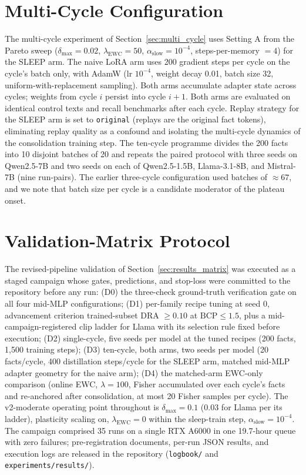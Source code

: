 \section{Multi-Cycle Configuration}
\label{app:multi_cycle}

The multi-cycle experiment of Section~\ref{sec:multi_cycle} uses Setting A from the Pareto sweep ($\delta_{\max} = 0.02$, $\lambda_{\mathrm{EWC}} = 50$, $\alpha_{\mathrm{slow}} = 10^{-4}$, steps-per-memory $= 4$) for the SLEEP arm. The naive LoRA arm uses 200 gradient steps per cycle on the cycle's batch only, with AdamW (lr $10^{-4}$, weight decay 0.01, batch size 32, uniform-with-replacement sampling). Both arms accumulate adapter state across cycles; weights from cycle $i$ persist into cycle $i+1$. Both arms are evaluated on identical control texts and recall benchmarks after each cycle. Replay strategy for the SLEEP arm is set to \texttt{original} (replays are the original fact tokens), eliminating replay quality as a confound and isolating the multi-cycle dynamics of the consolidation training step. The ten-cycle programme divides the 200 facts into 10 disjoint batches of 20 and repeats the paired protocol with three seeds on Qwen2.5-7B and two seeds on each of Qwen2.5-1.5B, Llama-3.1-8B, and Mistral-7B (nine run-pairs). The earlier three-cycle configuration used batches of $\approx 67$, and we note that batch size per cycle is a candidate moderator of the plateau onset.

\section{Validation-Matrix Protocol}
\label{app:matrix}

The revised-pipeline validation of Section~\ref{sec:results_matrix} was executed as a staged campaign whose gates, predictions, and stop-loss were committed to the repository before any run: (D0) the three-check ground-truth verification gate on all four mid-MLP configurations; (D1) per-family recipe tuning at seed 0, advancement criterion trained-subset DRA $\geq 0.10$ at $\mathrm{BCP} \leq 1.5$, plus a mid-campaign-registered clip ladder for Llama with its selection rule fixed before execution; (D2) single-cycle, five seeds per model at the tuned recipes (200 facts, 1{,}500 training steps); (D3) ten-cycle, both arms, two seeds per model (20 facts/cycle, 400 distillation steps/cycle for the SLEEP arm, matched mid-MLP adapter geometry for the naive arm); (D4) the matched-arm EWC-only comparison (online EWC, $\lambda=100$, Fisher accumulated over each cycle's facts and re-anchored after consolidation, at most 20 Fisher samples per cycle). The v2-moderate operating point throughout is $\delta_{\max}=0.1$ (0.03 for Llama per its ladder), plasticity scaling on, $\lambda_{\mathrm{EWC}}=0$ within the sleep-train step, $\alpha_{\mathrm{slow}}=10^{-4}$. The campaign comprised 35 runs on a single RTX A6000 in one 19.7-hour queue with zero failures; pre-registration documents, per-run JSON results, and execution logs are released in the repository (\texttt{logbook/} and \texttt{experiments/results/}).


